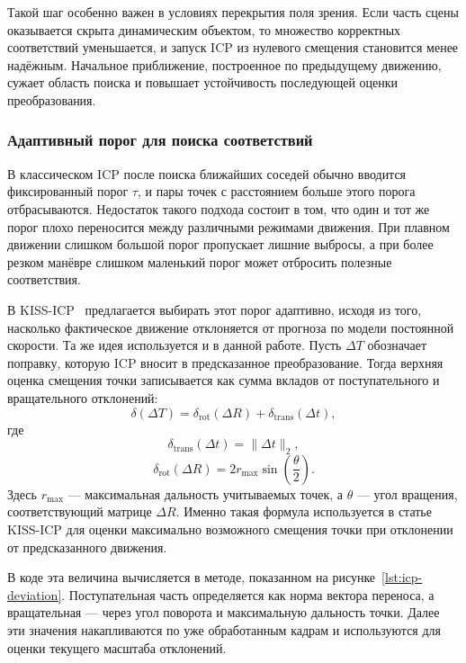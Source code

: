 Такой шаг особенно важен в условиях перекрытия поля зрения. Если часть сцены оказывается скрыта динамическим объектом, то множество корректных соответствий уменьшается, и запуск ICP из нулевого смещения становится менее надёжным. Начальное приближение, построенное по предыдущему движению, сужает область поиска и повышает устойчивость последующей оценки преобразования.

\subsubsection{Адаптивный порог для поиска соответствий}

В классическом ICP после поиска ближайших соседей обычно вводится фиксированный порог \(\tau\), и пары точек с расстоянием больше этого порога отбрасываются. Недостаток такого подхода состоит в том, что один и тот же порог плохо переносится между различными режимами движения. При плавном движении слишком большой порог пропускает лишние выбросы, а при более резком манёвре слишком маленький порог может отбросить полезные соответствия.

В KISS-ICP~\cite{kiss-icp} предлагается выбирать этот порог адаптивно, исходя из того, насколько фактическое движение отклоняется от прогноза по модели постоянной скорости. Та же идея используется и в данной работе. Пусть \(\Delta T\) обозначает поправку, которую ICP вносит в предсказанное преобразование. Тогда верхняя оценка смещения точки записывается как сумма вкладов от поступательного и вращательного отклонений:
\begin{equation}
    \delta(\Delta T) = \delta_{\mathrm{rot}}(\Delta R) + \delta_{\mathrm{trans}}(\Delta t),
\end{equation}
где
\begin{equation}
    \delta_{\mathrm{trans}}(\Delta t) = \|\Delta t\|_2,
\end{equation}
\begin{equation}
    \delta_{\mathrm{rot}}(\Delta R) = 2 r_{\max} \sin\left(\frac{\theta}{2}\right).
\end{equation}
Здесь \(r_{\max}\) --- максимальная дальность учитываемых точек, а \(\theta\) --- угол вращения, соответствующий матрице \(\Delta R\). Именно такая формула используется в статье KISS-ICP для оценки максимально возможного смещения точки при отклонении от предсказанного движения.

В коде эта величина вычисляется в методе, показанном на рисунке~\ref{lst:icp-deviation}. Поступательная часть определяется как норма вектора переноса, а вращательная --- через угол поворота и максимальную дальность точки. Далее эти значения накапливаются по уже обработанным кадрам и используются для оценки текущего масштаба отклонений.

